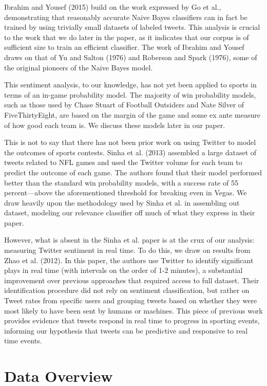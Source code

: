 \documentclass[12pt]{article}
\begin{document}
\begin{doublespacing}
Ibrahim and Yousef (2015) build on the work expressed by Go et al., demonstrating that reasonably accurate Naive Bayes classifiers can in fact be trained by using trivially small datasets of labeled tweets. This analysis is crucial to the work that we do later in the paper, as it indicates that our corpus is of sufficient size to train an efficient classifier. The work of Ibrahim and Yousef draws on that of Yu and Salton (1976) and Roberson and Spark (1976), some of the original pioneers of the Naive Bayes model.   

This sentiment analysis, to our knowledge, has not yet been applied to sports in terms of an in-game probability model. The majority of win probability models, such as those used by Chase Stuart of Football Outsiders and Nate Silver of FiveThirtyEight, are based on the margin of the game and some ex ante measure of how good each team is. We discuss these models later in our paper. 

This is not to say that there has not been prior work on using Twitter to model the outcomes of sports contests. Sinha et al. (2013) assembled a large dataset of tweets related to NFL games and used the Twitter volume for each team to predict the outcome of each game. The authors found that their model performed better than the standard win probability models, with a success rate of 55 percent---above the aforementioned threshold for breaking even in Vegas. We draw heavily upon the methodology used by Sinha et al. in assembling out dataset, modeling our relevance classifier off much of what they express in their paper.  

However, what is absent in the Sinha et al. paper is at the crux of our analysis: measuring Twitter sentiment in real time. To do this, we draw on results from Zhao et al. (2012). In this paper, the authors use Twitter to identify significant plays in real time (with intervals on the order of 1-2 minutes), a substantial improvement over previous approaches that required access to full dataset. Their identification procedure did not rely on sentiment classification, but rather on Tweet rates from specific users and grouping tweets based on whether they were most likely to have been sent by humans or machines. This piece of previous work provides evidence that tweets respond in real time to progress in sporting events, informing our hypothesis that tweets can be predictive and responsive to real time events. 

\section{Data Overview}


\end{doublespacing}
\end{document}
